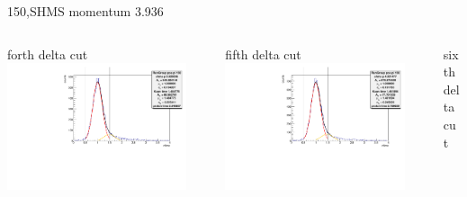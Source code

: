 \documentclass[aspectratio=169,xcolor=dvipsnames]{beamer}
\begin{document}
\begin{frame}{150,SHMS momentum 3.936}
\begin{columns}
\begin{column}[T]{0.3\textwidth}
\end{column}
\end{columns}
\begin{columns}
\begin{column}[T]{0.3\textwidth}
forth delta cut \\
\includegraphics[width = 0.9\textwidth]{results/pid/rftime/rftime_pos_150_3_pi.pdf}
\end{column}
\begin{column}[T]{0.3\textwidth}
fifth delta cut \\
\includegraphics[width = 0.9\textwidth]{results/pid/rftime/rftime_pos_150_4_pi.pdf}
\end{column}
\begin{column}[T]{0.3\textwidth}
sixth delta cut \\

\end{column}
\end{columns}
\end{frame}
\end{document}
